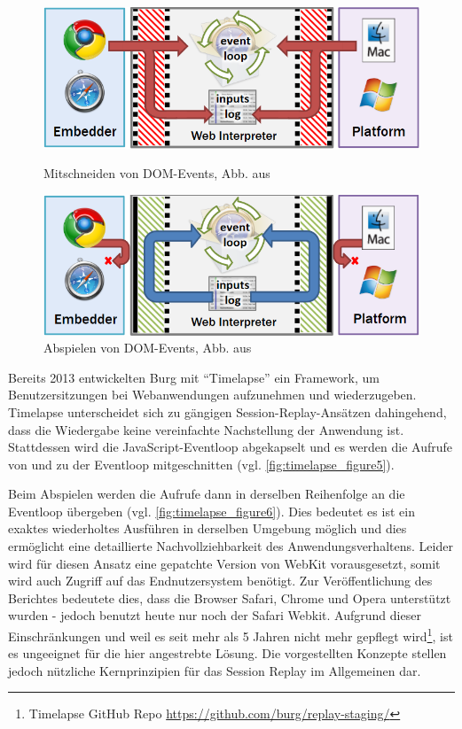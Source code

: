 \begin{figure}
\centering
\includegraphics[width=\linewidth]{img/03_methoden/timelapse_figure5.png}
\caption{Mitschneiden von DOM-Events, Abb. aus \cite{TimelapsePaper}}
\label{fig:timelapse_figure5}
\smallskip\par
\includegraphics[width=\linewidth]{img/03_methoden/timelapse_figure6.png}
\caption{Abspielen von DOM-Events, Abb. aus \cite{TimelapsePaper}}
\label{fig:timelapse_figure6}
\end{figure}

Bereits 2013 entwickelten Burg \etal \cite{TimelapsePaper} mit \enquote{Timelapse} ein Framework, um Benutzersitzungen bei Webanwendungen aufzunehmen und wiederzugeben. Timelapse unterscheidet sich zu gängigen Session-Replay-Ansätzen dahingehend, dass die Wiedergabe keine vereinfachte Nachstellung der Anwendung ist. Stattdessen wird die JavaScript-Eventloop abgekapselt und es werden die Aufrufe von und zu der Eventloop mitgeschnitten (vgl. \autoref{fig:timelapse_figure5}).

Beim Abspielen werden die Aufrufe dann in derselben Reihenfolge an die Eventloop übergeben (vgl. \autoref{fig:timelapse_figure6}). Dies bedeutet es ist ein exaktes wiederholtes Ausführen in derselben Umgebung möglich und dies ermöglicht eine detaillierte Nachvollziehbarkeit des Anwendungsverhaltens. Leider wird für diesen Ansatz eine gepatchte Version von WebKit \cite{WebKit} vorausgesetzt, somit wird auch Zugriff auf das Endnutzersystem benötigt. Zur Veröffentlichung des Berichtes bedeutete dies, dass die Browser Safari, Chrome und Opera unterstützt wurden - jedoch benutzt heute nur noch der Safari Webkit. Aufgrund dieser Einschränkungen und weil es seit mehr als 5 Jahren nicht mehr gepflegt wird\footnote{Timelapse GitHub Repo \url{https://github.com/burg/replay-staging/}}, ist es ungeeignet für die hier angestrebte Lösung. Die vorgestellten Konzepte stellen jedoch nützliche Kernprinzipien für das Session Replay im Allgemeinen dar.